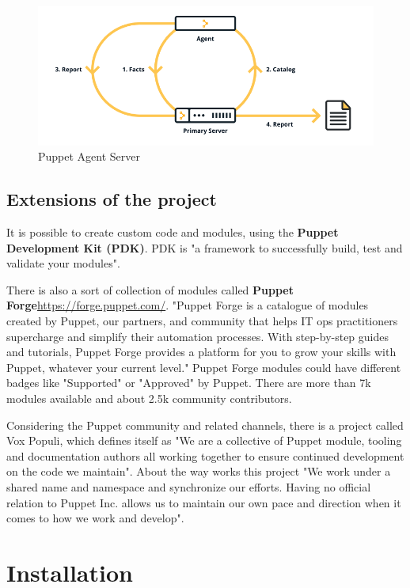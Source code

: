 \documentclass[12pt,a4paper,openright,twoside]{book}
\begin{document}
\begin{figure}[H]
    \centering
    \includegraphics[width=.8\linewidth]{figures/puppetagentserverjpeg.png}
    \caption{Puppet Agent Server}
    \label{fig:chef-agent-server-image}
\end{figure}\cite{puppetDocWhatIs}

\subsection{Extensions of the project}
It is possible to create custom code and modules, using the \textbf{Puppet Development Kit (PDK)}.
PDK is "a framework to successfully build, test and validate your modules"\cite{puppetDocPDK}.


There is also a sort of collection of modules called \textbf{Puppet Forge}\url{https://forge.puppet.com/}.
"Puppet Forge is a catalogue of modules created by Puppet, our partners, and community that helps IT ops practitioners supercharge and simplify their automation processes. With step-by-step guides and tutorials, Puppet Forge provides a platform for you to grow your skills with Puppet, whatever your current level."\cite{puppetForge}
Puppet Forge modules could have different badges like "Supported" or "Approved" by Puppet.
There are more than 7k modules available and about 2.5k community contributors.

Considering the Puppet community and related channels, there is a project called Vox Populi, which defines itself as "We are a collective of Puppet module, tooling and documentation authors all working together to ensure continued development on the code we maintain"\cite{puppetVox}.
About the way works this project "We work under a shared name and namespace and synchronize our efforts. Having no official relation to Puppet Inc. allows us to maintain our own pace and direction when it comes to how we work and develop"\cite{puppetVox}.

\section{Installation}
\end{document}
